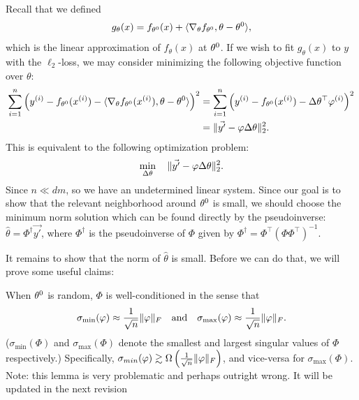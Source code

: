 Recall that we defined
\begin{align}
    g_\theta(x) = f_{\theta^{0}}(x) + \langle\nabla_\theta f_{\theta^{0}}, \theta - \theta^{0}\rangle,
\end{align}
which is the linear approximation of $f_\theta(x)$ at $\theta^{0}$. If we wish to fit $g_\theta(x)$ to $y$ with the $\ell_2$-loss, we may consider minimizing the following objective function over $\theta$:
\begin{align}
\sum_{i=1}^n \left( y^{(i)} - f_{\theta^{0}}(x^{(i)}) - \langle \nabla_\theta f_{\theta^{0}}(x^{(i)}), \theta - \theta^{0} \rangle \right)^2 
&=  \sum_{i=1}^n \left(y^{(i)} - f_{\theta^{0}}(x^{(i)}) - \Delta\theta^\top \varphi^{(i)} \right)^2 \\
&=  \|\vec{y'} - \varphi \Delta\theta\|_2^2.
\end{align}
This is equivalent to the following optimization problem:
\begin{align}
    \min_{\Delta \theta} \quad \|\vec{y'} - \varphi \Delta\theta\|_2^2. \label{lec12:eqn:opt-problem}
\end{align}
Since $n \ll dm$, so we have an undetermined linear system. Since our goal is to show that the relevant neighborhood around $\theta^{0}$ is small, we should choose the minimum norm solution which can be found directly by the pseudoinverse: $\hat{\theta} = \Phi^\dagger \vec{y'}$,  where $\Phi^\dagger$ is the pseudoinverse of $\Phi$ given by $\Phi^\dagger = \Phi^\top (\Phi \Phi^\top)^{-1}$.

It remains to show that the norm of $\hat{\theta}$ is small. Before we can do that, we will prove some useful claims:

\begin{lemma}\label{lec12:lem:claim1}
When $\theta^{0}$ is random, $\Phi$ is well-conditioned in the sense that \begin{align}
\sigma_{\min}(\varphi) \approx \frac{1}{\sqrt{n}} \|\varphi\|_F \quad \text{and} \quad
\sigma_{\max}(\varphi) \approx \frac{1}{\sqrt{n}} \|\varphi\|_F.
\end{align}
($\sigma_{\min}(\Phi)$ and $\sigma_{\max}(\Phi)$ denote the smallest and largest singular values of $\Phi$ respectively.) Specifically, $\sigma_{min}(\varphi) \gtrsim \Omega \left( \frac{1}{\sqrt{n}} \|\varphi\|_F \right)$, and vice-versa for $\sigma_{\max}(\Phi)$.
{\color{blue} Note: this lemma is very problematic and perhaps outright wrong. It will be updated in the next revision}
\end{lemma}

